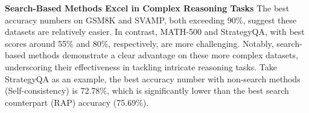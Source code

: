 
\textbf{Search-Based Methods Excel in Complex Reasoning Tasks}
\hspace{5pt}
The best accuracy numbers on GSM8K and SVAMP, both exceeding 90\%, suggest these datasets are relatively easier. 
In contrast, MATH-500 and StrategyQA, with best scores around 55\% and 80\%, respectively, are more challenging. 
Notably, search-based methods demonstrate a clear advantage on these more complex datasets, underscoring their effectiveness in tackling intricate reasoning tasks.
Take StrategyQA as an example, the best accuracy number with non-search methods (Self-consistency) is 72.78\%, which is significantly lower than the best search counterpart (RAP) accuracy (75.69\%).



